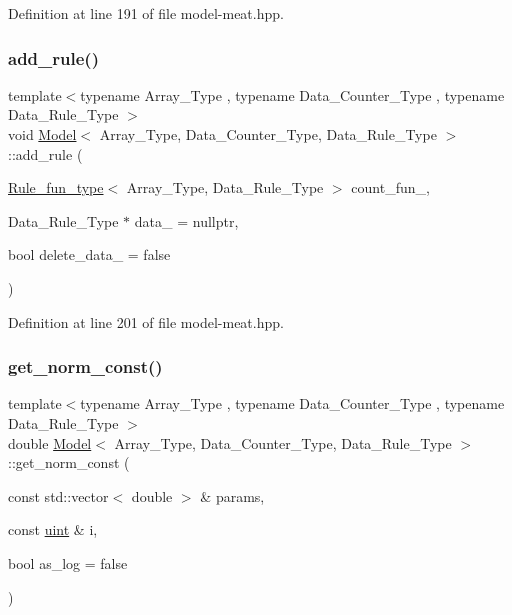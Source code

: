 Definition at line 191 of file model-\/meat.\+hpp.

\mbox{\label{class_model_af3a1a343dfff4f40443bee4ddf76a0ba}} 
\subsubsection{\texorpdfstring{add\+\_\+rule()}{add\_rule()}\hspace{0.1cm}{\footnotesize\ttfamily [3/3]}}
{\footnotesize\ttfamily template$<$typename Array\+\_\+\+Type , typename Data\+\_\+\+Counter\+\_\+\+Type , typename Data\+\_\+\+Rule\+\_\+\+Type $>$ \\
void \hyperlink{class_model}{Model}$<$ Array\+\_\+\+Type, Data\+\_\+\+Counter\+\_\+\+Type, Data\+\_\+\+Rule\+\_\+\+Type $>$\+::add\+\_\+rule (\begin{DoxyParamCaption}\item[{\hyperlink{typedefs_8hpp_a2e147c9c0e8b65be614c98a5dd400d5c}{Rule\+\_\+fun\+\_\+type}$<$ Array\+\_\+\+Type, Data\+\_\+\+Rule\+\_\+\+Type $>$}]{count\+\_\+fun\+\_\+,  }\item[{Data\+\_\+\+Rule\+\_\+\+Type $\ast$}]{data\+\_\+ = {\ttfamily nullptr},  }\item[{bool}]{delete\+\_\+data\+\_\+ = {\ttfamily false} }\end{DoxyParamCaption})\hspace{0.3cm}{\ttfamily [inline]}}



Definition at line 201 of file model-\/meat.\+hpp.

\mbox{\label{class_model_a8de55fd86cdca46936e455721754a2af}} 
\subsubsection{\texorpdfstring{get\+\_\+norm\+\_\+const()}{get\_norm\_const()}}
{\footnotesize\ttfamily template$<$typename Array\+\_\+\+Type , typename Data\+\_\+\+Counter\+\_\+\+Type , typename Data\+\_\+\+Rule\+\_\+\+Type $>$ \\
double \hyperlink{class_model}{Model}$<$ Array\+\_\+\+Type, Data\+\_\+\+Counter\+\_\+\+Type, Data\+\_\+\+Rule\+\_\+\+Type $>$\+::get\+\_\+norm\+\_\+const (\begin{DoxyParamCaption}\item[{const std\+::vector$<$ double $>$ \&}]{params,  }\item[{const \hyperlink{typedefs_8hpp_a91ad9478d81a7aaf2593e8d9c3d06a14}{uint} \&}]{i,  }\item[{bool}]{as\+\_\+log = {\ttfamily false} }\end{DoxyParamCaption})\hspace{0.3cm}{\ttfamily [inline]}}




